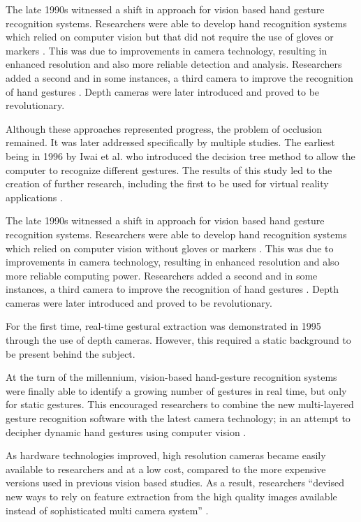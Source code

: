 The late 1990s witnessed a shift in approach for vision based hand gesture recognition systems. Researchers were able to develop hand recognition systems which relied on computer vision but that did not require the use of gloves or markers \parencite{Rehg1994}. This was due to improvements in camera technology, resulting in enhanced resolution and also more reliable detection and analysis. Researchers added a second and in some instances, a third camera to improve the recognition of hand gestures \parencite{Gennery1992}  \parencite{Darrell1993}. Depth cameras were later introduced and proved to be revolutionary. 

Although these approaches represented progress, the problem of occlusion remained. It was later addressed specifically by multiple studies. The earliest being in 1996 by Iwai et al. \parencite{Iwai1996} who introduced the decision tree method to allow the computer to recognize different gestures. The results of this study led to the creation of further research, including the first to be used for virtual reality applications \parencite{Wang2009}. 

The late 1990s witnessed a shift in approach for vision based hand gesture recognition systems. Researchers were able to develop hand recognition systems which relied on computer vision without gloves or markers \parencite{Rehg1994}. This was due to improvements in camera technology, resulting in enhanced resolution and also more reliable computing power. Researchers added a second and in some instances, a third camera to improve the recognition of hand gestures \parencite{Gennery1992}  \parencite{Darrell1993}. Depth cameras were later introduced and proved to be revolutionary. 

For the first time, real-time gestural extraction was demonstrated in 1995 \parencite{Bobick1995}  \parencite{Utsumi1999} through the use of depth cameras. However, this required a static background to be present behind the subject.  

At the turn of the millennium, vision-based hand-gesture recognition systems were finally able to identify a growing number of gestures in real time, but only for static gestures. This encouraged researchers to combine the new multi-layered gesture recognition software with the latest camera technology; in an attempt to decipher dynamic hand gestures using computer vision \parencite{Starner1995}. 

As hardware technologies improved, high resolution cameras became easily available to researchers and at a low cost, compared to the more expensive versions used in previous vision based studies. As a result, researchers ``devised new ways to rely on feature extraction from the high quality images available instead of sophisticated multi camera system'' \parencite{Chen2003}. 

